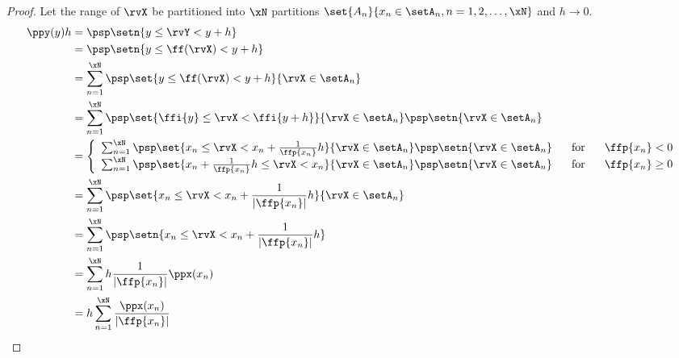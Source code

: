 \begin{theorem}
\label{thm:Y=f(X)}
\end{theorem}
\begin{proof}
Let the range of $\rvX$ be partitioned into $\xN$ partitions
$\set{A_n}{x_n\in\setA_n, n=1,2,\ldots,\xN}$ and $h\to0$.
\begin{align*}
  \ppy(y)h
    &= \psp\setn{y \le\rvY < y+h}
  \\&= \psp\setn{y \le \ff(\rvX) < y+h}
  \\&= \sum_{n=1}^{\xN} \psp\set{y \le \ff(\rvX) < y+h}{\rvX\in\setA_n}
  \\&= \sum_{n=1}^{\xN} \psp\set{\ffi{y} \le\rvX < \ffi{y+h}}{\rvX\in\setA_n}\psp\setn{\rvX\in\setA_n}
  \\&= \left\{\begin{array}{l@{\hspace{4ex}\mbox{for}\hspace{4ex}}l}
         \sum_{n=1}^{\xN} \psp\set{x_n     \le\rvX < x_n + \frac{1}{\ffp{x_n}}h}{\rvX\in\setA_n}\psp\setn{\rvX\in\setA_n} & \ffp{x_n}<0 \\
         \sum_{n=1}^{\xN} \psp\set{x_n + \frac{1}{\ffp{x_n}}h \le\rvX < x_n}{\rvX\in\setA_n}\psp\setn{\rvX\in\setA_n}     & \ffp{x_n}\ge0
       \end{array}\right.
  \\&= \sum_{n=1}^{\xN} \psp\set{x_n     \le\rvX < x_n + \frac{1}{|\ffp{x_n}|}h}{\rvX\in\setA_n}
  \\&= \sum_{n=1}^{\xN} \psp\setn{x_n     \le\rvX < x_n + \frac{1}{|\ffp{x_n}|}h}
  \\&= \sum_{n=1}^{\xN} h \frac{1}{|\ffp{x_n}|} \ppx(x_n)
  \\&= h \sum_{n=1}^{\xN} \frac{\ppx(x_n)}{|\ffp{x_n}|}
\end{align*}
\end{proof}

